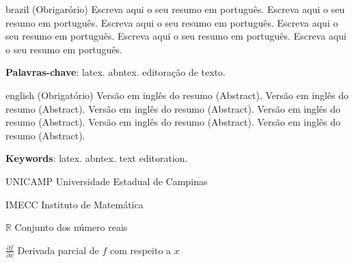 \documentclass[
	oldfontcommands,
	sumario=abnt-6027-2012,
	12pt,
	openright,
	oneside,
	a4paper,
	english,
	english
	]{imecc-unicamp}
\begin{document}
\setlength{\absparsep}{18pt}
\begin{resumo}[Resumo]
 \begin{otherlanguage*}{brazil}
    (Obrigarório) Escreva aqui o seu resumo em português. Escreva aqui o
    seu resumo em português. Escreva aqui o seu resumo em português.
    Escreva aqui o seu resumo em português. Escreva aqui o seu resumo em
    português. Escreva aqui o seu resumo em português.

    \textbf{Palavras-chave}: latex. abntex. editoração de texto.
 \end{otherlanguage*}
\end{resumo}
\begin{resumo}[Abstract]
 \begin{otherlanguage*}{english}
    (Obrigatório) Versão em inglês do resumo (Abstract). Versão em
    inglês do resumo (Abstract). Versão em inglês do resumo (Abstract).
    Versão em inglês do resumo (Abstract). Versão em inglês do resumo
    (Abstract). Versão em inglês do resumo (Abstract).

    \textbf{Keywords}: latex. abntex. text editoration.
 \end{otherlanguage*}
\end{resumo}

  \listoffigures*
  \cleardoublepage

  \listoftables*
  \cleardoublepage

  \begin{siglas}
        \item[UNICAMP] Universidade Estadual de Campinas
        \item[IMECC] Instituto de Matemática
      \end{siglas}

\begin{simbolos}
    \item[\(\mathds{R}\)] Conjunto dos número reais
    \item[\(\frac{\partial f}{\partial x}\)] Derivada parcial de \(f\)
com respeito a \(x\)
  \end{simbolos}

\listofalgorithms
\cleardoublepage

\begin{KeepFromToc}
\lstlistoflistings
\end{KeepFromToc}
\cleardoublepage
\end{document}
